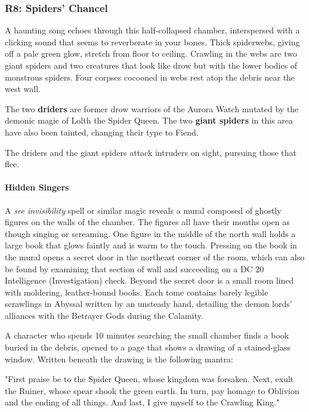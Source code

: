 \documentclass[a4paper, 11pt, bg=full, twocolumn, nooutline]{dndbook}
\begin{document}
\subsubsection{R8: Spiders' Chancel}

\begin{DndReadAloud}
A haunting song echoes through this half-collapsed chamber, interspersed with a clicking sound that seems to reverberate in your bones. Thick spiderwebs, giving off a pale green glow, stretch from floor to ceiling. Crawling in the webs are two giant spiders and two creatures that look like drow but with the lower bodies of monstrous spiders. Four corpses cocooned in webs rest atop the debris near the west wall.
\end{DndReadAloud}

The two \textbf{driders} are former drow warriors of the Aurora Watch mutated by the demonic magic of Lolth the Spider Queen. The two \textbf{giant spiders} in this area have also been tainted, changing their type to Fiend.

The driders and the giant spiders attack intruders on sight, pursuing those that flee.

\paragraph{Hidden Singers}

A \textit{see invisibility} spell or similar magic reveals a mural composed of ghostly figures on the walls of the chamber. The figures all have their mouths open as though singing or screaming. One figure in the middle of the north wall holds a large book that glows faintly and is warm to the touch. Pressing on the book in the mural opens a secret door in the northeast corner of the room, which can also be found by examining that section of wall and succeeding on a DC 20 Intelligence (Investigation) check. Beyond the secret door is a small room lined with moldering, leather-bound books. Each tome contains barely legible scrawlings in Abyssal written by an unsteady hand, detailing the demon lords' alliances with the Betrayer Gods during the Calamity.

A character who spends 10 minutes searching the small chamber finds a book buried in the debris, opened to a page that shows a drawing of a stained-glass window. Written beneath the drawing is the following mantra:

\begin{DndReadAloud}
"First praise be to the Spider Queen, whose kingdom was forsaken. Next, exult the Ruiner, whose spear shook the green earth. In turn, pay homage to Oblivion and the ending of all things. And last, I give myself to the Crawling King."
\end{DndReadAloud}
\end{document}
